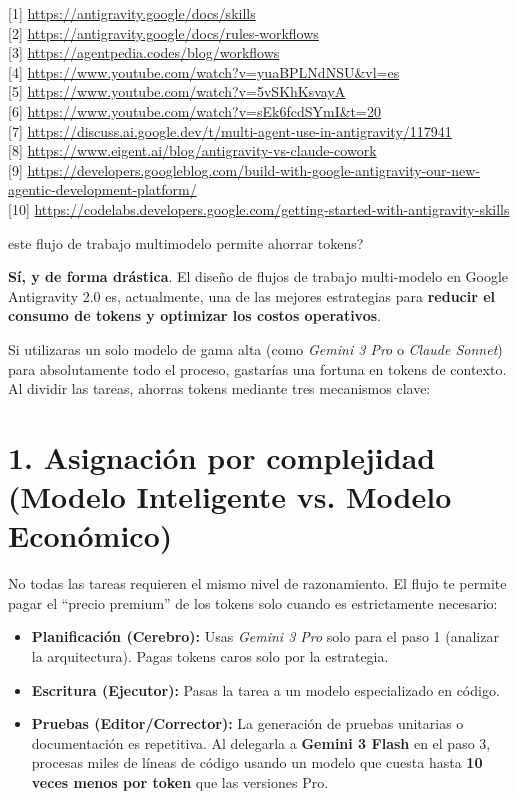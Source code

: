 \documentclass[12pt, a4paper]{article}
\begin{document}
[1] \url{https://antigravity.google/docs/skills} \\{}
[2] \url{https://antigravity.google/docs/rules-workflows} \\{}
[3] \url{https://agentpedia.codes/blog/workflows} \\{}
[4] \url{https://www.youtube.com/watch?v=yuaBPLNdNSU&vl=es} \\{}
[5] \url{https://www.youtube.com/watch?v=5vSKhKsvayA} \\{}
[6] \url{https://www.youtube.com/watch?v=sEk6fcdSYmI&t=20} \\{}
[7] \url{https://discuss.ai.google.dev/t/multi-agent-use-in-antigravity/117941} \\{}
[8] \url{https://www.eigent.ai/blog/antigravity-vs-claude-cowork} \\{}
[9] \url{https://developers.googleblog.com/build-with-google-antigravity-our-new-agentic-development-platform/} \\{}
[10] \url{https://codelabs.developers.google.com/getting-started-with-antigravity-skills}

este flujo de trabajo multimodelo permite ahorrar tokens?

\textbf{Sí, y de forma drástica}. El diseño de flujos de trabajo multi-modelo en Google Antigravity 2.0 es, actualmente, una de las mejores estrategias para \textbf{reducir el consumo de tokens y optimizar los costos operativos}.

Si utilizaras un solo modelo de gama alta (como \textit{Gemini 3 Pro} o \textit{Claude Sonnet}) para absolutamente todo el proceso, gastarías una fortuna en tokens de contexto. Al dividir las tareas, ahorras tokens mediante tres mecanismos clave:

\section*{1. Asignación por complejidad (Modelo Inteligente vs. Modelo Económico)}

No todas las tareas requieren el mismo nivel de razonamiento. El flujo te permite pagar el ``precio premium'' de los tokens solo cuando es estrictamente necesario:

\begin{itemize}
    \item \textbf{Planificación (Cerebro):} Usas \textit{Gemini 3 Pro} solo para el paso 1 (analizar la arquitectura). Pagas tokens caros solo por la estrategia.
    \item \textbf{Escritura (Ejecutor):} Pasas la tarea a un modelo especializado en código.
    \item \textbf{Pruebas (Editor/Corrector):} La generación de pruebas unitarias o documentación es repetitiva. Al delegarla a \textbf{Gemini 3 Flash} en el paso 3, procesas miles de líneas de código usando un modelo que cuesta hasta \textbf{10 veces menos por token} que las versiones Pro.
\end{itemize}
\end{document}
